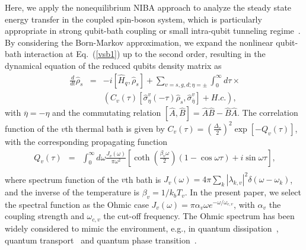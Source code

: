 \documentclass[twocolumn,preprintnumbers,amsmath,amssymb]{revtex4}
\begin{document}
Here, we apply the nonequilibrium NIBA approach to analyze the steady state energy transfer in the coupled spin-boson system,
which is particularly appropriate in strong qubit-bath coupling  or small intra-qubit tunneling regime~\cite{dvirasegal2006prb,tianchen2013prb}.
By considering the Born-Markov approximation, we expand the nonlinear qubit-bath interaction at Eq.~(\ref{vsb1}) up to the second order,
resulting in the dynamical equation of the reduced qubits density matrix as
\begin{eqnarray}~\label{qme0}
\frac{d}{dt}\hat{\rho}_s&=&-i[\hat{H}_q,\hat{\rho}_s]
+\sum_{v=s,g,d;\eta=\pm}\int^{\infty}_0d{\tau}{\times}\nonumber\\
&&(C_{v}(\tau)[\hat{\sigma}^v_{\eta}(-\tau)\hat{\rho}_s,\hat{\sigma}^v_{\overline{\eta}}]
+H.c.),
\end{eqnarray}
with $\overline{\eta}=-\eta$ and the commutating relation $[\hat{A},\hat{B}]=\hat{A}\hat{B}-\hat{B}\hat{A}$.
The correlation function of the $v$th thermal bath is given by $C_v(\tau)=(\frac{\Delta_v}{2})^2\exp{[-Q_v(\tau)]}$, with the corresponding propagating function
\begin{eqnarray}~\label{q1}
Q_v(\tau)&=&\int^{\infty}_0d{\omega}\frac{J_v(\omega)}{\pi\omega^2}[\coth(\frac{\beta_v\omega}{2})(1-\cos\omega\tau)+i\sin\omega\tau],\nonumber\\
\end{eqnarray}
where spectrum function of the $v$th bath is
$J_v(\omega)=4\pi\sum_k|\lambda_{k,v}|^2\delta(\omega-\omega_k)$,
and the inverse of the temperature is $\beta_v=1/k_bT_v$.
In the present paper, we select the spectral function as the Ohmic case
$J_v(\omega)={\pi\alpha_v\omega}e^{-\omega/\omega_{c,v}}$,
with $\alpha_v$ the coupling strength and $\omega_{c,v}$ the cut-off frequency.
The Ohmic spectrum has been widely considered to mimic the environment, e.g., in quantum dissipation~\cite{ajleggett1987rmp,uweiss2008book}, quantum transport~\cite{ksaito2013prl,akato2015jcp} and quantum phase transition~\cite{pwerner2005prl,lwduan2013jcp,zcai2014prl}.
\end{document}
